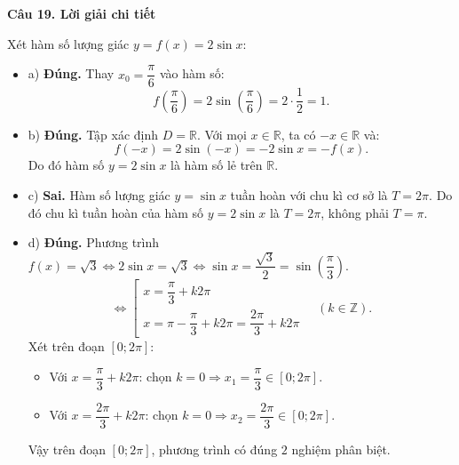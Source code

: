\documentclass[12pt, a4paper]{article}
\begin{document}
\noindent\textbf{Câu 19. Lời giải chi tiết}\par
\begin{tcolorbox}[enhanced,breakable,colback=solutionbg,colframe=secondary!50!black,frame hidden,borderline west={3pt}{0pt}{secondary!50!black}]
Xét hàm số lượng giác $y = f(x) = 2\sin x$:
\begin{itemize}[leftmargin=1.5em]
\item a) \textbf{Đúng.} Thay $x_0 = \dfrac{\pi}{6}$ vào hàm số:
$$f\left(\dfrac{\pi}{6}\right) = 2\sin\left(\dfrac{\pi}{6}\right) = 2\cdot \dfrac{1}{2} = 1.$$

\item b) \textbf{Đúng.} Tập xác định $D = \mathbb{R}$. Với mọi $x \in \mathbb{R}$, ta có $-x \in \mathbb{R}$ và:
$$f(-x) = 2\sin(-x) = -2\sin x = -f(x).$$
Do đó hàm số $y = 2\sin x$ là hàm số lẻ trên $\mathbb{R}$.

\item c) \textbf{Sai.} Hàm số lượng giác $y = \sin x$ tuần hoàn với chu kì cơ sở là $T = 2\pi$. Do đó chu kì tuần hoàn của hàm số $y = 2\sin x$ là $T = 2\pi$, không phải $T = \pi$.

\item d) \textbf{Đúng.} Phương trình $f(x) = \sqrt{3} \Leftrightarrow 2\sin x = \sqrt{3} \Leftrightarrow \sin x = \dfrac{\sqrt{3}}{2} = \sin\left(\dfrac{\pi}{3}\right)$.
$$\Leftrightarrow \left[\begin{array}{l}
x = \dfrac{\pi}{3} + k2\pi \\[6pt]
x = \pi - \dfrac{\pi}{3} + k2\pi = \dfrac{2\pi}{3} + k2\pi
\end{array}\right. \quad (k\in\mathbb{Z}).$$
Xét trên đoạn $[0; 2\pi]$:
\begin{itemize}
\item Với $x = \dfrac{\pi}{3} + k2\pi$: chọn $k = 0 \Rightarrow x_1 = \dfrac{\pi}{3} \in [0; 2\pi]$.
\item Với $x = \dfrac{2\pi}{3} + k2\pi$: chọn $k = 0 \Rightarrow x_2 = \dfrac{2\pi}{3} \in [0; 2\pi]$.
\end{itemize}
Vậy trên đoạn $[0; 2\pi]$, phương trình có đúng $2$ nghiệm phân biệt.
\end{itemize}
\end{tcolorbox}
\end{document}
